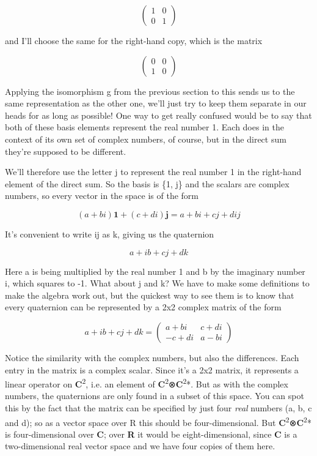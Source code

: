 \documentclass[oneside,english]{amsbook}
\numberwithin{section}{chapter}
\theoremstyle{plain}
\theoremstyle{definition}
\begin{document}
\[\begin{pmatrix}
	1 & 0 \\
	0 & 1
\end{pmatrix}\]

and I'll choose the same for the right-hand copy, which is the matrix

\[\begin{pmatrix}
	0 & 0 \\
	1 & 0
\end{pmatrix}\]

Applying the isomorphism g from the previous section to this sends us to
the same representation as the other one, we'll just try to keep them
separate in our heads for as long as possible! One way to get really
confused would be to say that both of these basis elements represent the
real number 1. Each does in the context of its own set of complex
numbers, of course, but in the direct sum they're supposed to be
different.

We'll therefore use the letter j to represent the real number 1 in the
right-hand element of the direct sum. So the basis is \{1, j\} and the
scalars are complex numbers, so every vector in the space is of the form

\[(a + bi)\mathbf{1} + (c + di)\mathbf{j =}a + bi + cj + dij\]

It's convenient to write ij as k, giving us the quaternion

\[a + ib + cj + dk\]

Here a is being multiplied by the real number 1 and b by the imaginary
number i, which squares to -1. What about j and k? We have to make some
definitions to make the algebra work out, but the quickest way to see
them is to know that every quaternion can be represented by a 2x2
complex matrix of the form

\[a + ib + cj + dk = \begin{pmatrix}
	a + bi & c + di \\
	- c + di & a - bi
\end{pmatrix}\]

Notice the similarity with the complex numbers, but also the
differences. Each entry in the matrix is a complex scalar. Since it's a
2x2 matrix, it represents a linear operator on
\textbf{C}\textsuperscript{2}, i.e. an element of
\textbf{C}\textsuperscript{2}⊗\textbf{C}\textsuperscript{2}*. But as
with the complex numbers, the quaternions are only found in a subset of
this space. You can spot this by the fact that the matrix can be
specified by just four \emph{real} numbers (a, b, c and d); so as a
vector space over R this should be four-dimensional. But
\textbf{C}\textsuperscript{2}⊗\textbf{C}\textsuperscript{2}* is
four-dimensional over \textbf{C}; over \textbf{R} it would be
eight-dimensional, since \textbf{C} is a two-dimensional real vector
space and we have four copies of them here.
\end{document}
